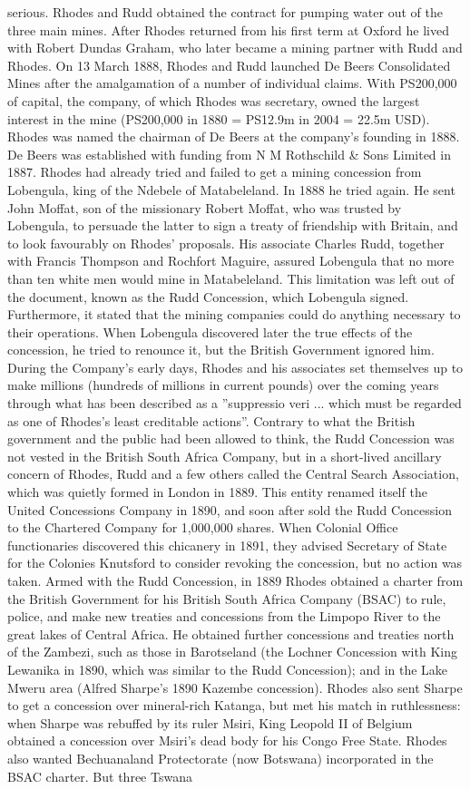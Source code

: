 \documentclass[11pt,a4paper, onecolumn]{article}
\begin{document}
serious. Rhodes and Rudd obtained the contract for pumping water out of the three main mines. After Rhodes returned from his first term at Oxford he lived with Robert Dundas Graham, who later became a mining partner with Rudd and Rhodes. On 13 March 1888, Rhodes and Rudd launched De Beers Consolidated Mines after the amalgamation of a number of individual claims. With PS200,000 of capital, the company, of which Rhodes was secretary, owned the largest interest in the mine (PS200,000 in 1880 = PS12.9m in 2004 =  22.5m USD). Rhodes was named the chairman of De Beers at the company's founding in 1888. De Beers was established with funding from N M Rothschild & Sons Limited in 1887. Rhodes had already tried and failed to get a mining concession from Lobengula, king of the Ndebele of Matabeleland. In 1888 he tried again. He sent John Moffat, son of the missionary Robert Moffat, who was trusted by Lobengula, to persuade the latter to sign a treaty of friendship with Britain, and to look favourably on Rhodes' proposals. His associate Charles Rudd, together with Francis Thompson and Rochfort Maguire, assured Lobengula that no more than ten white men would mine in Matabeleland. This limitation was left out of the document, known as the Rudd Concession, which Lobengula signed. Furthermore, it stated that the mining companies could do anything necessary to their operations. When Lobengula discovered later the true effects of the concession, he tried to renounce it, but the British Government ignored him. During the Company's early days, Rhodes and his associates set themselves up to make millions (hundreds of millions in current pounds) over the coming years through what has been described as a ''suppressio veri ... which must be regarded as one of Rhodes's least creditable actions''. Contrary to what the British government and the public had been allowed to think, the Rudd Concession was not vested in the British South Africa Company, but in a short-lived ancillary concern of Rhodes, Rudd and a few others called the Central Search Association, which was quietly formed in London in 1889. This entity renamed itself the United Concessions Company in 1890, and soon after sold the Rudd Concession to the Chartered Company for 1,000,000 shares. When Colonial Office functionaries discovered this chicanery in 1891, they advised Secretary of State for the Colonies Knutsford to consider revoking the concession, but no action was taken. Armed with the Rudd Concession, in 1889 Rhodes obtained a charter from the British Government for his British South Africa Company (BSAC) to rule, police, and make new treaties and concessions from the Limpopo River to the great lakes of Central Africa. He obtained further concessions and treaties north of the Zambezi, such as those in Barotseland (the Lochner Concession with King Lewanika in 1890, which was similar to the Rudd Concession); and in the Lake Mweru area (Alfred Sharpe's 1890 Kazembe concession). Rhodes also sent Sharpe to get a concession over mineral-rich Katanga, but met his match in ruthlessness: when Sharpe was rebuffed by its ruler Msiri, King Leopold II of Belgium obtained a concession over Msiri's dead body for his Congo Free State. Rhodes also wanted Bechuanaland Protectorate (now Botswana) incorporated in the BSAC charter. But three Tswana 
\end{document}
